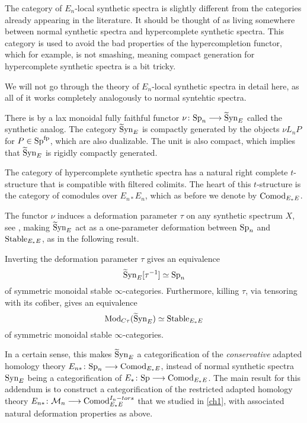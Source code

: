 \begin{remark}
    The category of $E_n$-local synthetic spectra is slightly different from the categories already appearing in the literature. It should be thought of as living somewhere between normal synthetic spectra and hypercomplete synthetic spectra. This category is used to avoid the bad properties of the hypercompletion functor, which for example, is not smashing, meaning compact generation for hypercomplete synthetic spectra is a bit tricky. 
\end{remark}

We will not go through the theory of $E_n$-local synthetic spectra in detail here, as all of it works completely analogously to normal syntehtic spectra. 

There is by \cite[4.4, 4.38]{pstragowski_2022} a lax monoidal fully faithful functor $\nu\colon\mathrm{Sp}_n \longrightarrow \widetilde{\mathrm{S}}\mathrm{yn}_{E}$ called the synthetic analog. The category $\widetilde{\mathrm{S}}\mathrm{yn}_{E}$ is compactly generated by the objects $\nu L_n P$ for $P\in \mathrm{Sp}^{\mathrm{fp}}$, which are also dualizable. The unit is also compact, which implies that $\widetilde{\mathrm{S}}\mathrm{yn}_{E}$ is rigidly compactly generated. 

The category of hypercomplete synthetic spectra has a natural right complete $t$-structure that is compatible with filtered colimits. The heart of this $t$-structure is the category of comodules over $E_{n*}E_n$, which as before we denote by $\mathrm{Comod}_{E_*E}$. 

The functor $\nu$ induces a deformation parameter $\tau$ on any synthetic spectrum $X$, see \cite[Section 4.3]{pstragowski_2022}, making $\widetilde{\mathrm{S}}\mathrm{yn}_{E}$ act as a one-parameter deformation between $\mathrm{Sp}_n$ and $\mathrm{Stable}_{E_*E}$, as in the following result. 

\begin{theorem}
    \label{ch3:add:thm:deformation-properties-of-syn}
    Inverting the deformation parameter $\tau$ gives an equivalence 
    \[\widetilde{\mathrm{S}}\mathrm{yn}_{E}[\tau^{-1}]\simeq \mathrm{Sp}_n\]
    of symmetric monoidal stable $\infty$-categories. Furthermore, killing $\tau$, via tensoring with its cofiber, gives an equivalence 
    \[\mathrm{Mod}_{C\tau}(\widetilde{\mathrm{S}}\mathrm{yn}_{E})\simeq \mathrm{Stable}_{E_*E}\]
    of symmetric monoidal stable $\infty$-categories. 
\end{theorem}

In a certain sense, this makes $\widetilde{\mathrm{S}}\mathrm{yn}_{E}$ a categorification of the \emph{conservative} adapted homology theory $E_{n*}\colon \mathrm{Sp}_n\longrightarrow \mathrm{Comod}_{E_*E}$, instead of normal synthetic spectra $\mathrm{Syn}_{E}$ being a categorification of $E_* \colon \mathrm{Sp}\longrightarrow \mathrm{Comod}_{E_*E}$. The main result for this addendum is to construct a categorification of the restricted adapted homology theory $E_{n*}\colon \mathcal{M}_{n} \longrightarrow \mathrm{Comod}_{E_*E}^{I_n-tors}$ that we studied in \cref{ch1}, with associated natural deformation properties as above. 

